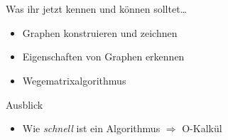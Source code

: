 \section{}
	\begin{frame}{Was ihr jetzt kennen und können solltet\dots}
			\begin{itemize}
				\item Graphen konstruieren und zeichnen
				\item Eigenschaften von Graphen erkennen
				\item Wegematrixalgorithmus
			\end{itemize}
	
	\end{frame}
	\begin{frame}{Ausblick}
		\begin{itemize}
			\item Wie \emph{schnell} ist ein Algorithmus $\Rightarrow$ O-Kalkül 
		\end{itemize}
	\end{frame}
\section{}
\questionframe
\lastframe
{}
